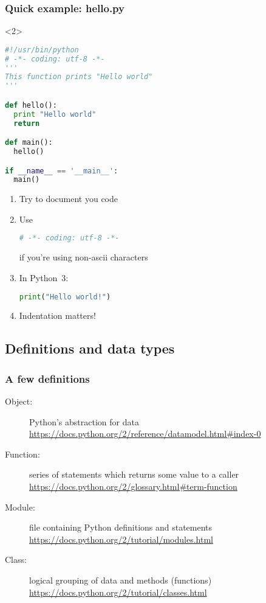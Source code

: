 \begin{frame}[t, fragile]
\frametitle{Quick example: hello.py}

{\huge
\faLaptop
}


\begin{onlyenv}<2>
\begin{lstlisting}[language=python]
#!/usr/bin/python
# -*- coding: utf-8 -*-
'''
This function prints "Hello world"
'''

def hello():
  print "Hello world"
  return

def main():
  hello()

if __name__ == '__main__':
  main()
\end{lstlisting}
\end{onlyenv}

{\normalsize
\begin{enumerate}
\item<3-> Try to document you code
\item<4-> Use 
\begin{lstlisting}[language=python]
# -*- coding: utf-8 -*- 
\end{lstlisting}
if you're using non-ascii characters
\item<5-> In Python~3: 
\begin{lstlisting}[language=python]
print("Hello world!")
\end{lstlisting}
\item<6-> Indentation matters!
\end{enumerate}
}
\end{frame}

\subsection{Definitions and data types}
\begin{frame}[fragile]
\frametitle{A few definitions}

\begin{description}
\item[Object:] Python's abstraction for data\\
\url{https://docs.python.org/2/reference/datamodel.html#index-0}
\item[Function:] series of statements which returns some value to a caller\\
\url{https://docs.python.org/2/glossary.html#term-function}
\item[Module:] file containing Python definitions and statements\\
\url{https://docs.python.org/2/tutorial/modules.html}
\item[Class:] logical grouping of data and methods (functions)\\
\url{https://docs.python.org/2/tutorial/classes.html}
\end{description}

\end{frame}


